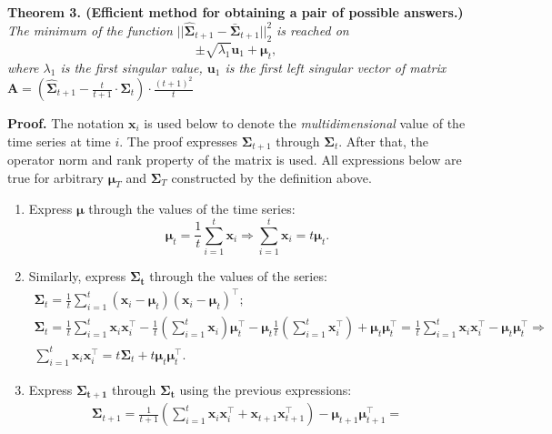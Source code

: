 \documentclass{article}
\begin{document}
{\textbf{Theorem 3. (Efficient method for obtaining a pair of possible answers.)} \textit{ The minimum of the function $||\hat{\mathbf{\Sigma}}_{t+1} - \bar{\mathbf{\Sigma}}_{t+1}||_2^2$ is reached on \[\pm\sqrt{\lambda_1} \mathbf{u}_1 + \boldsymbol{\mu}_t,\] where $\lambda_1$ is the first singular value, $\mathbf{u}_1$ is the first left singular vector of matrix $\mathbf{A}=\left(\hat{\mathbf{\Sigma}}_{t+1} - \frac{t}{t+1} \cdot \mathbf{\Sigma}_t \right) \cdot \frac{(t+1)^2}{t}$}

\textbf{Proof.} The notation $\mathbf{x}_i$ is used below to denote the \textit{multidimensional} value of the time series at time $i$. The proof expresses $\mathbf{\Sigma}_{t+1}$ through $\mathbf{\Sigma}_t$. After that, the operator norm and rank property of the matrix is used. All expressions below are true for arbitrary $\boldsymbol{\mu}_T$ and $\mathbf{\Sigma}_T$ constructed by the definition above.
\begin{enumerate}
	\item Express $\boldsymbol{\mu}$ through the values of the time series: \[\boldsymbol{\mu}_t = \frac{1}{t} \sum_{i=1}^{t} \mathbf{x}_i \Rightarrow \sum_{i=1}^{t} \mathbf{x}_i = t \boldsymbol{\mu}_t.\]
	\item Similarly, express $\mathbf{\Sigma_t}$ through the values of the series:
		\begin{gather*}
		\mathbf{\Sigma}_t = \frac{1}{t} \sum_{i=1}^{t} (\mathbf{x}_i-\boldsymbol{\mu}_t)(\mathbf{x}_i-\boldsymbol{\mu}_t)^\intercal;\\
		\mathbf{\Sigma}_t = \frac{1}{t} \sum_{i=1}^{t} \mathbf{x}_i \mathbf{x}_i^\intercal - \frac{1}{t} \left( \sum_{i=1}^{t} \mathbf{x}_i\right) \boldsymbol{\mu}_t^\intercal - \boldsymbol{\mu}_t \frac{1}{t} \left( \sum_{i=1}^{t} \mathbf{x}_i^\intercal\right) + \boldsymbol{\mu}_t \boldsymbol{\mu}_t^\intercal = \frac{1}{t} \sum_{i=1}^{t} \mathbf{x}_i \mathbf{x}_i^\intercal - \boldsymbol{\mu}_t \boldsymbol{\mu}_t^\intercal \Rightarrow\\
		\sum_{i=1}^{t} \mathbf{x}_i \mathbf{x}_i^\intercal = t \mathbf{\Sigma}_t + t \boldsymbol{\mu}_t \boldsymbol{\mu}_t^\intercal.
		\end{gather*}
	\item Express $\mathbf{\Sigma_{t+1}}$ through $\mathbf{\Sigma_t}$ using the previous expressions:
	\begin{gather*}
		\mathbf{\Sigma}_{t+1} = \frac{1}{t+1} \left(\sum_{i=1}^{t} \mathbf{x}_i \mathbf{x}_i^\intercal + \mathbf{x}_{t+1} \mathbf{x}_{t+1}^\intercal \right) - \boldsymbol{\mu}_{t+1} \boldsymbol{\mu}_{t+1}^\intercal = \\

\end{gather*}
\end{enumerate}}
\end{document}

